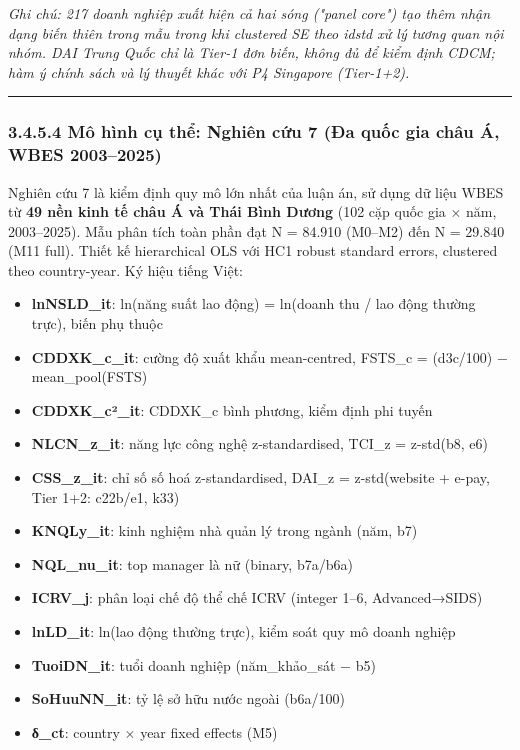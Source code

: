 \documentclass[12pt,a4paper]{article}
\providecommand{\tightlist}{\setlength{\itemsep}{0pt}\setlength{\parskip}{0pt}}
\begin{document}
\emph{Ghi chú: 217 doanh nghiệp xuất hiện cả hai sóng ("panel core") tạo
thêm nhận dạng biến thiên trong mẫu trong khi clustered SE theo idstd xử
lý tương quan nội nhóm. DAI Trung Quốc chỉ là Tier-1 đơn biến, không đủ
để kiểm định CDCM; hàm ý chính sách và lý thuyết khác với P4 Singapore
(Tier-1+2).}

\begin{center}\rule{0.5\linewidth}{0.5pt}\end{center}

\hypertarget{3454-muxf4-huxecnh-cux1ee5-thux1ec3-nghiuxean-cux1ee9u-7-ux111a-quux1ed1c-gia-chuxe2u-uxe1-wbes-20032025}{%
\subsubsection{3.4.5.4 Mô hình cụ thể: Nghiên cứu 7 (Đa quốc gia châu Á,
WBES
2003--2025)}\label{3454-muxf4-huxecnh-cux1ee5-thux1ec3-nghiuxean-cux1ee9u-7-ux111a-quux1ed1c-gia-chuxe2u-uxe1-wbes-20032025}}

Nghiên cứu 7 là kiểm định quy mô lớn nhất của luận án, sử dụng dữ liệu
WBES từ \textbf{49 nền kinh tế châu Á và Thái Bình Dương} (102 cặp quốc
gia × năm, 2003--2025). Mẫu phân tích toàn phần đạt N = 84.910 (M0--M2)
đến N = 29.840 (M11 full). Thiết kế hierarchical OLS với HC1 robust
standard errors, clustered theo country-year. Ký hiệu tiếng Việt:

\begin{itemize}
\tightlist
\item
  \textbf{lnNSLD\_it}: ln(năng suất lao động) = ln(doanh thu / lao động
  thường trực), biến phụ thuộc
\item
  \textbf{CDDXK\_c\_it}: cường độ xuất khẩu mean-centred, FSTS\_c =
  (d3c/100) − mean\_pool(FSTS)
\item
  \textbf{CDDXK\_c²\_it}: CDDXK\_c bình phương, kiểm định phi tuyến
\item
  \textbf{NLCN\_z\_it}: năng lực công nghệ z-standardised, TCI\_z =
  z-std(b8, e6)
\item
  \textbf{CSS\_z\_it}: chỉ số số hoá z-standardised, DAI\_z =
  z-std(website + e-pay, Tier 1+2: c22b/e1, k33)
\item
  \textbf{KNQLy\_it}: kinh nghiệm nhà quản lý trong ngành (năm, b7)
\item
  \textbf{NQL\_nu\_it}: top manager là nữ (binary, b7a/b6a)
\item
  \textbf{ICRV\_j}: phân loại chế độ thể chế ICRV (integer 1--6,
  Advanced→SIDS)
\item
  \textbf{lnLD\_it}: ln(lao động thường trực), kiểm soát quy mô doanh
  nghiệp
\item
  \textbf{TuoiDN\_it}: tuổi doanh nghiệp (năm\_khảo\_sát − b5)
\item
  \textbf{SoHuuNN\_it}: tỷ lệ sở hữu nước ngoài (b6a/100)
\item
  \textbf{δ\_ct}: country × year fixed effects (M5)
\end{itemize}
\end{document}
